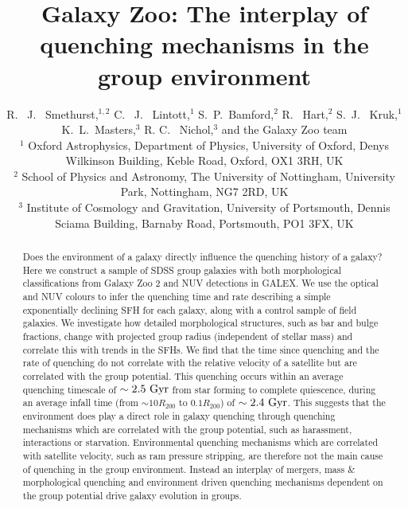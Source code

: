 \documentclass[useAMS,usenatbib]{mn2e}
\begin{document}
\title[Quenching in the group environment]{Galaxy Zoo: The interplay of quenching mechanisms in the group environment}
\author[Smethurst et al. 2017]{R. ~J. ~Smethurst,$^{1,2}$ C. ~J. ~Lintott,$^{1}$ S.~P.~Bamford,$^{2}$ R. ~Hart,$^{2}$ \newauthor S.~J. ~Kruk,$^{1}$ K.~L.~Masters,$^{3}$  R. C. ~Nichol,$^{3}$ and the Galaxy Zoo team \footnotemark[1]
\\ $^1$ Oxford Astrophysics, Department of Physics, University of Oxford, Denys Wilkinson Building, Keble Road, Oxford, OX1 3RH, UK 
\\ $^2$ School of Physics and Astronomy, The University of Nottingham, University Park, Nottingham, NG7 2RD, UK
\\ $^3$ Institute of Cosmology and Gravitation, University of Portsmouth, Dennis Sciama Building, Barnaby Road, Portsmouth, PO1 3FX, UK 
}

\maketitle

\begin{abstract}
Does the environment of a galaxy directly influence the quenching history of a galaxy? Here we construct a sample of SDSS group galaxies with both morphological classifications from Galaxy Zoo 2 and NUV detections in GALEX. We use the optical and NUV colours to infer the quenching time and rate describing a simple exponentially declining SFH for each galaxy, along with a control sample of field galaxies. We investigate how detailed morphological structures, such as bar and bulge fractions, change with projected group radius (independent of stellar mass) and correlate this with trends in the SFHs. We find that the time since quenching and the rate of quenching do not correlate with the relative velocity of a satellite but are correlated with the group potential. This quenching occurs within an average quenching timescale of $\sim2.5~\rm{Gyr}$ from star forming to complete quiescence, during an average infall time (from $\sim 10R_{200}$ to $0.1R_{200}$) of $\sim 2.4~\rm{Gyr}$. This suggests that the environment does play a direct role in galaxy quenching through quenching mechanisms which are correlated with the group potential, such as harassment, interactions or starvation. Environmental quenching mechanisms which are correlated with satellite velocity, such as ram pressure stripping, are therefore not the main cause of quenching in the group environment. Instead an interplay of mergers, mass \& morphological quenching and environment driven quenching mechanisms dependent on the group potential drive galaxy evolution in groups. 

\end{abstract}
\end{document}
